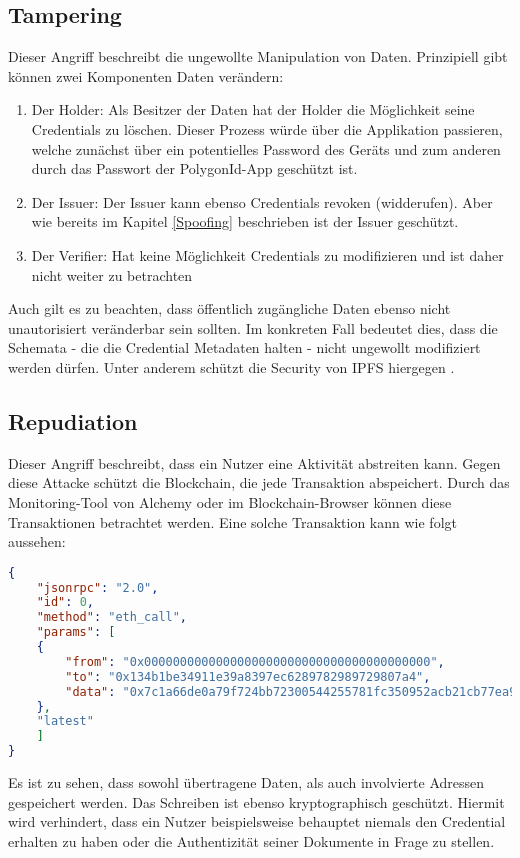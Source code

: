 \subsection{Tampering}
Dieser Angriff beschreibt die ungewollte Manipulation von Daten. Prinzipiell gibt können zwei Komponenten Daten verändern:
\begin{enumerate}
	\item Der Holder: Als Besitzer der Daten hat der Holder die Möglichkeit seine Credentials zu löschen. Dieser Prozess würde über die Applikation passieren, welche zunächst über ein potentielles Password des Geräts und zum anderen durch das Passwort der PolygonId-App geschützt ist.
	\item Der Issuer: Der Issuer kann ebenso Credentials revoken (widderufen). Aber wie bereits im Kapitel \ref{Spoofing} beschrieben ist der Issuer geschützt.
	\item Der Verifier: Hat keine Möglichkeit Credentials zu modifizieren und ist daher nicht weiter zu betrachten
\end{enumerate}
Auch gilt es zu beachten, dass öffentlich zugängliche Daten ebenso nicht unautorisiert veränderbar sein sollten. Im konkreten Fall bedeutet dies, dass die Schemata - die die Credential Metadaten halten - nicht ungewollt modifiziert werden dürfen. Unter anderem schützt die Security von IPFS hiergegen \cite{ID65}.

\subsection{Repudiation}
\label{Repudiation}
Dieser Angriff beschreibt, dass ein Nutzer eine Aktivität abstreiten kann. Gegen diese Attacke schützt die Blockchain, die jede Transaktion abspeichert. Durch das Monitoring-Tool von Alchemy oder im Blockchain-Browser können diese Transaktionen betrachtet werden. Eine solche Transaktion kann wie folgt aussehen:

\begin{lstlisting}[language=json,firstnumber=1]
{
	"jsonrpc": "2.0",
	"id": 0,
	"method": "eth_call",
	"params": [
	{
		"from": "0x0000000000000000000000000000000000000000",
		"to": "0x134b1be34911e39a8397ec6289782989729807a4",
		"data": "0x7c1a66de0a79f724bb72300544255781fc350952acb21cb77ea9a719c8eebb7d1a055ad0"
	},
	"latest"
	]
}
\end{lstlisting}	
Es ist zu sehen, dass sowohl übertragene Daten, als auch involvierte Adressen gespeichert werden. Das Schreiben ist ebenso kryptographisch geschützt. Hiermit wird verhindert, dass ein Nutzer beispielsweise behauptet niemals den Credential erhalten zu haben oder die Authentizität seiner Dokumente in Frage zu stellen. 

